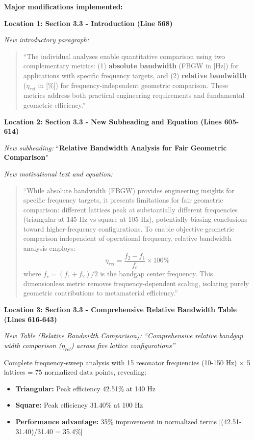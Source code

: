\documentclass[11pt,a4paper]{article}
\newenvironment{changesbox}{%
    \par\medskip\noindent{\color{changescolor}\rule{\linewidth}{2pt}}\par
    \noindent{\color{changescolor}\bfseries Manuscript Changes}\par\smallskip
}{%
    \par\noindent{\color{changescolor}\rule{\linewidth}{0.5pt}}\medskip
}
\begin{document}
\begin{changesbox}
\textbf{Major modifications implemented:}

\textbf{Location 1: Section 3.3 - Introduction (Line 568)}

\textit{New introductory paragraph:}
\begin{quote}
\textcolor{redtext}{``The individual analyses enable quantitative comparison using two complementary metrics: (1) \textbf{absolute bandwidth} (FBGW in [Hz]) for applications with specific frequency targets, and (2) \textbf{relative bandwidth} ($\eta_{rel}$ in [\%]) for frequency-independent geometric comparison. These metrics address both practical engineering requirements and fundamental geometric efficiency.''}
\end{quote}

\textbf{Location 2: Section 3.3 - New Subheading and Equation (Lines 605-614)}

\textit{New subheading:} ``\textbf{Relative Bandwidth Analysis for Fair Geometric Comparison}''

\textit{New motivational text and equation:}
\begin{quote}
\textcolor{redtext}{``While absolute bandwidth (FBGW) provides engineering insights for specific frequency targets, it presents limitations for fair geometric comparison: different lattices peak at substantially different frequencies (triangular at 145 Hz vs square at 105 Hz), potentially biasing conclusions toward higher-frequency configurations. To enable objective geometric comparison independent of operational frequency, relative bandwidth analysis employs:
\begin{equation}
\eta_{rel} = \frac{f_2 - f_1}{f_c} \times 100\%
\end{equation}
where $f_c = (f_1 + f_2)/2$ is the bandgap center frequency. This dimensionless metric removes frequency-dependent scaling, isolating purely geometric contributions to metamaterial efficiency.''}
\end{quote}

\textbf{Location 3: Section 3.3 - Comprehensive Relative Bandwidth Table (Lines 616-643)}

\textit{New Table (Relative Bandwidth Comparison): ``Comprehensive relative bandgap width comparison ($\eta_{rel}$) across five lattice configurations''}

Complete frequency-sweep analysis with 15 resonator frequencies (10-150 Hz) $\times$ 5 lattices = 75 normalized data points, revealing:
\begin{itemize}
    \item \textbf{Triangular:} Peak efficiency 42.51\% at 140 Hz
    \item \textbf{Square:} Peak efficiency 31.40\% at 100 Hz
    \item \textbf{Performance advantage:} 35\% improvement in normalized terms [(42.51-31.40)/31.40 = 35.4\%]
\end{itemize}


\end{changesbox}
\end{document}
